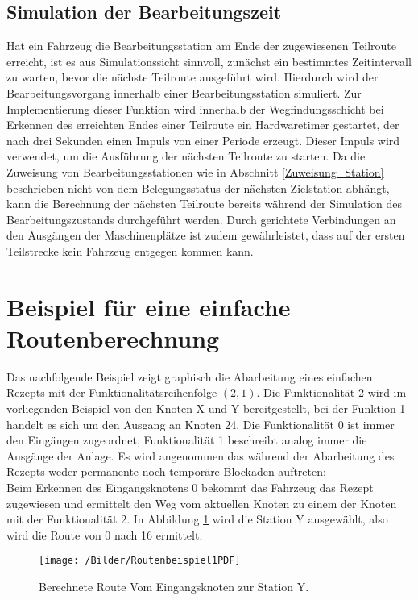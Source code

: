 		\subsection{Simulation der Bearbeitungszeit}
			\label{Simulation Station}
			Hat ein Fahrzeug die Bearbeitungsstation am Ende der zugewiesenen Teilroute erreicht, ist es aus Simulationssicht sinnvoll, zunächst ein bestimmtes Zeitintervall zu warten, bevor die nächste Teilroute ausgeführt wird. Hierdurch wird der Bearbeitungsvorgang innerhalb einer Bearbeitungsstation simuliert. Zur Implementierung dieser Funktion wird innerhalb der Wegfindungsschicht bei Erkennen des erreichten Endes einer Teilroute ein Hardwaretimer gestartet, der nach drei Sekunden einen Impuls von einer Periode erzeugt. Dieser Impuls wird verwendet, um die Ausführung der nächsten Teilroute zu starten. Da die Zuweisung von Bearbeitungsstationen wie in Abschnitt \ref{Zuweisung_Station} beschrieben nicht von dem Belegungsstatus der nächsten Zielstation abhängt, kann die Berechnung der nächsten Teilroute bereits während der Simulation des Bearbeitungszustands durchgeführt werden. Durch gerichtete Verbindungen an den Ausgängen der Maschinenplätze ist zudem gewährleistet, dass auf der ersten Teilstrecke kein Fahrzeug entgegen kommen kann.
	
		
	\section{Beispiel für eine einfache Routenberechnung}
	
		Das nachfolgende Beispiel zeigt graphisch die Abarbeitung eines einfachen Rezepts mit der Funktionalitätsreihenfolge $(2,1)$. Die Funktionalität 2 wird im vorliegenden Beispiel von den Knoten X und Y bereitgestellt, bei der Funktion 1 handelt es sich um den Ausgang an Knoten 24. Die Funktionalität 0 ist immer den Eingängen zugeordnet, Funktionalität 1 beschreibt analog immer die Ausgänge der Anlage. Es wird angenommen das während der Abarbeitung des Rezepts weder permanente noch temporäre Blockaden auftreten:
		\\[6pt]
		
		Beim Erkennen des Eingangsknotens 0 bekommt das Fahrzeug das Rezept zugewiesen und ermittelt den Weg vom aktuellen Knoten zu einem der Knoten mit der Funktionalität 2. In Abbildung \ref{Routenbeispiel1} wird die Station Y ausgewählt, also wird die Route von 0 nach 16 ermittelt.
		
		\begin{figure}[H]
			\centering
			\texttt{[image: /Bilder/Routenbeispiel1PDF]}
			\vspace{0.2cm}
			\caption{Berechnete Route Vom Eingangsknoten zur Station Y.}\label{Routenbeispiel1}
		\end{figure}
		
